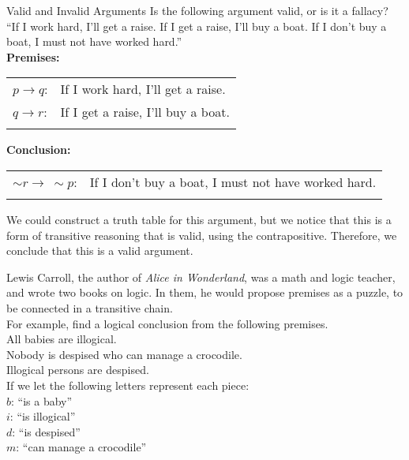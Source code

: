 \begin{example}[https://www.youtube.com/watch?v=IbjD73wapPs]{Valid and Invalid Arguments}
Is the following argument valid, or is it a fallacy?\\

``If I work hard, I'll get a raise.  If I get a raise, I'll buy a boat.  If I don't buy a boat, I must not have worked hard.''\\

\textbf{Premises:}\\
\begin{tabular}{l l}
$p \to q$: & If I work hard, I'll get a raise.\\
$q \to r$: & If I get a raise, I'll buy a boat.\\
& \\
\end{tabular}

\textbf{Conclusion:}\\
\begin{tabular}{l l}
$\sim r \to\ \sim p$: & If I don't buy a boat, I must not have worked hard.\\
&
\end{tabular}

We could construct a truth table for this argument, but we notice that this is a form of transitive reasoning that is valid, using the contrapositive.  Therefore, we conclude that this is a valid argument.
\end{example}

Lewis Carroll, the author of \textit{Alice in Wonderland}, was a math and logic teacher, and wrote two books on logic.  In them, he would propose premises as a puzzle, to be connected in a transitive chain.\\

For example, find a logical conclusion from the following premises.\\
All babies are illogical.\\
Nobody is despised who can manage a crocodile.\\
Illogical persons are despised.\\

\noindent If we let the following letters represent each piece:\\
$b$: ``is a baby''\\
$i$: ``is illogical''\\
$d$: ``is despised''\\
$m$: ``can manage a crocodile''\\

